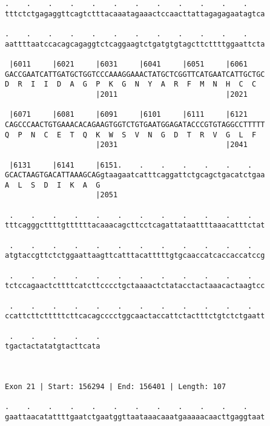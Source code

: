 \documentclass{article}
\begin{document}
\begin{Verbatim}
.    .    .    .    .    .    .    .    .    .    .    .    
tttctctgagaggttcagtctttacaaatagaaactccaacttattagagagaatagtca
                                                            
.    .    .    .    .    .    .    .    .    .    .    .    
aattttaatccacagcagaggtctcaggaagtctgatgtgtagcttcttttggaattcta
                                                            
 |6011     |6021     |6031     |6041     |6051     |6061    
GACCGAATCATTGATGCTGGTCCCAAAGGAAACTATGCTCGGTTCATGAATCATTGCTGC
D  R  I  I  D  A  G  P  K  G  N  Y  A  R  F  M  N  H  C  C  
                     |2011                         |2021    
  
 |6071     |6081     |6091     |6101     |6111     |6121    
CAGCCCAACTGTGAAACACAGAAGTGGTCTGTGAATGGAGATACCCGTGTAGGCCTTTTT
Q  P  N  C  E  T  Q  K  W  S  V  N  G  D  T  R  V  G  L  F  
                     |2031                         |2041    
  
 |6131     |6141     |6151.    .    .    .    .    .    .   
GCACTAAGTGACATTAAAGCAGgtaagaatcatttcaggattctgcagctgacatctgaa
A  L  S  D  I  K  A  G                                      
                     |2051                                  
  
 .    .    .    .    .    .    .    .    .    .    .    .   
tttcagggcttttgttttttacaaacagcttcctcagattataattttaaacatttctat
                                                            
 .    .    .    .    .    .    .    .    .    .    .    .   
atgtaccgttctctggaattaagttcatttacatttttgtgcaaccatcaccaccatccg
                                                            
 .    .    .    .    .    .    .    .    .    .    .    .   
tctccagaactcttttcatcttcccctgctaaaactctatacctactaaacactaagtcc
                                                            
 .    .    .    .    .    .    .    .    .    .    .    .   
ccattcttctttttcttcacagcccctggcaactaccattctactttctgtctctgaatt
                                                            
 .    .    .    .    .
tgactactatatgtacttcata
                      
                      
 
Exon 21 | Start: 156294 | End: 156401 | Length: 107
 
.    .    .    .    .    .    .    .    .    .    .    .    
gaattaacatattttgaatctgaatggttaataaacaaatgaaaaacaacttgaggtaat
                                                            

\end{Verbatim}
\end{document}
